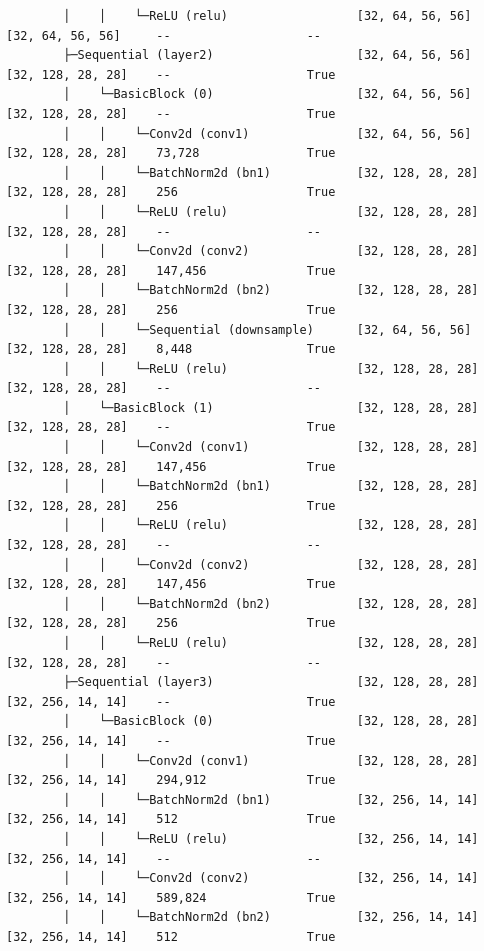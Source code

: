 \documentclass{article}
\begin{document}
\begin{latin}
\begin{lstlisting}
		│    │    └─ReLU (relu)                  [32, 64, 56, 56]     [32, 64, 56, 56]     --                   --
		├─Sequential (layer2)                    [32, 64, 56, 56]     [32, 128, 28, 28]    --                   True
		│    └─BasicBlock (0)                    [32, 64, 56, 56]     [32, 128, 28, 28]    --                   True
		│    │    └─Conv2d (conv1)               [32, 64, 56, 56]     [32, 128, 28, 28]    73,728               True
		│    │    └─BatchNorm2d (bn1)            [32, 128, 28, 28]    [32, 128, 28, 28]    256                  True
		│    │    └─ReLU (relu)                  [32, 128, 28, 28]    [32, 128, 28, 28]    --                   --
		│    │    └─Conv2d (conv2)               [32, 128, 28, 28]    [32, 128, 28, 28]    147,456              True
		│    │    └─BatchNorm2d (bn2)            [32, 128, 28, 28]    [32, 128, 28, 28]    256                  True
		│    │    └─Sequential (downsample)      [32, 64, 56, 56]     [32, 128, 28, 28]    8,448                True
		│    │    └─ReLU (relu)                  [32, 128, 28, 28]    [32, 128, 28, 28]    --                   --
		│    └─BasicBlock (1)                    [32, 128, 28, 28]    [32, 128, 28, 28]    --                   True
		│    │    └─Conv2d (conv1)               [32, 128, 28, 28]    [32, 128, 28, 28]    147,456              True
		│    │    └─BatchNorm2d (bn1)            [32, 128, 28, 28]    [32, 128, 28, 28]    256                  True
		│    │    └─ReLU (relu)                  [32, 128, 28, 28]    [32, 128, 28, 28]    --                   --
		│    │    └─Conv2d (conv2)               [32, 128, 28, 28]    [32, 128, 28, 28]    147,456              True
		│    │    └─BatchNorm2d (bn2)            [32, 128, 28, 28]    [32, 128, 28, 28]    256                  True
		│    │    └─ReLU (relu)                  [32, 128, 28, 28]    [32, 128, 28, 28]    --                   --
		├─Sequential (layer3)                    [32, 128, 28, 28]    [32, 256, 14, 14]    --                   True
		│    └─BasicBlock (0)                    [32, 128, 28, 28]    [32, 256, 14, 14]    --                   True
		│    │    └─Conv2d (conv1)               [32, 128, 28, 28]    [32, 256, 14, 14]    294,912              True
		│    │    └─BatchNorm2d (bn1)            [32, 256, 14, 14]    [32, 256, 14, 14]    512                  True
		│    │    └─ReLU (relu)                  [32, 256, 14, 14]    [32, 256, 14, 14]    --                   --
		│    │    └─Conv2d (conv2)               [32, 256, 14, 14]    [32, 256, 14, 14]    589,824              True
		│    │    └─BatchNorm2d (bn2)            [32, 256, 14, 14]    [32, 256, 14, 14]    512                  True

\end{lstlisting}
\end{latin}
\end{document}
